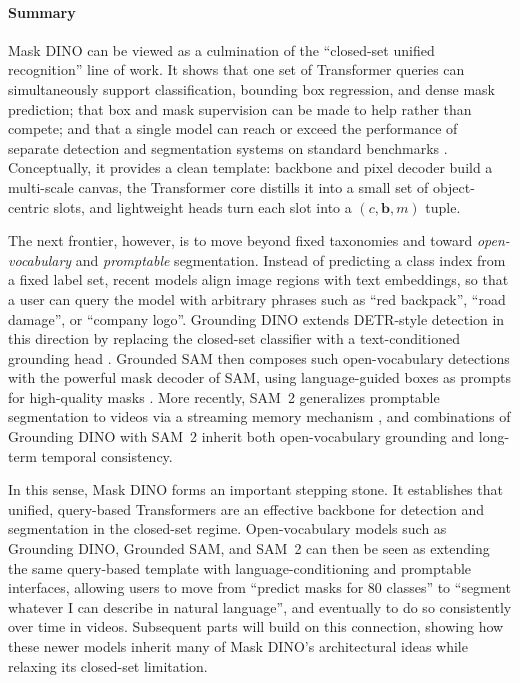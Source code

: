 \begin{enrichment}
\begin{enrichment}
		\paragraph{Summary}
		
		Mask DINO can be viewed as a culmination of the “closed-set unified recognition” line of work. It shows that one set of Transformer queries can simultaneously support classification, bounding box regression, and dense mask prediction; that box and mask supervision can be made to help rather than compete; and that a single model can reach or exceed the performance of separate detection and segmentation systems on standard benchmarks \cite{li2022_maskdino, zhang2022_dino, ke2023_hqsam}. Conceptually, it provides a clean template: backbone and pixel decoder build a multi-scale canvas, the Transformer core distills it into a small set of object-centric slots, and lightweight heads turn each slot into a \((c,\mathbf{b},m)\) tuple.
		
		The next frontier, however, is to move beyond fixed taxonomies and toward \emph{open-vocabulary} and \emph{promptable} segmentation. Instead of predicting a class index from a fixed label set, recent models align image regions with text embeddings, so that a user can query the model with arbitrary phrases such as “red backpack”, “road damage”, or “company logo”. Grounding DINO extends DETR-style detection in this direction by replacing the closed-set classifier with a text-conditioned grounding head \cite{liu2023_groundingdino}. Grounded SAM then composes such open-vocabulary detections with the powerful mask decoder of SAM, using language-guided boxes as prompts for high-quality masks \cite{ren2024_groundedsam, kirillov2023_sam}. More recently, SAM~2 generalizes promptable segmentation to videos via a streaming memory mechanism \cite{ravi2024_sam2}, and combinations of Grounding DINO with SAM~2 inherit both open-vocabulary grounding and long-term temporal consistency.
		
		In this sense, Mask DINO forms an important stepping stone. It establishes that unified, query-based Transformers are an effective backbone for detection and segmentation in the closed-set regime. Open-vocabulary models such as Grounding DINO, Grounded SAM, and SAM~2 can then be seen as extending the same query-based template with language-conditioning and promptable interfaces, allowing users to move from “predict masks for 80 classes” to “segment whatever I can describe in natural language”, and eventually to do so consistently over time in videos. Subsequent parts will build on this connection, showing how these newer models inherit many of Mask DINO’s architectural ideas while relaxing its closed-set limitation.
		

\end{enrichment}
\end{enrichment}

